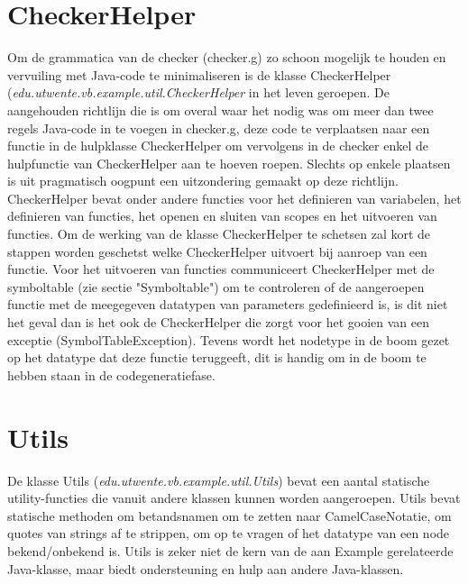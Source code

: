 \section{CheckerHelper}
Om de grammatica van de checker (checker.g) zo schoon mogelijk te houden en vervuiling met Java-code te minimaliseren is de klasse CheckerHelper (\emph{edu.utwente.vb.example.util.CheckerHelper} in het leven geroepen. De aangehouden richtlijn die is om overal waar het nodig was om meer dan twee regels Java-code in te voegen in checker.g, deze code te verplaatsen naar een functie in de hulpklasse CheckerHelper om vervolgens in de checker enkel de hulpfunctie van CheckerHelper aan te hoeven roepen. Slechts op enkele plaatsen is uit pragmatisch oogpunt een uitzondering gemaakt op deze richtlijn. CheckerHelper bevat onder andere functies voor het definieren van variabelen, het definieren van functies, het openen en sluiten van scopes en het uitvoeren van functies. Om de werking van de klasse CheckerHelper te schetsen zal kort de stappen worden geschetst welke CheckerHelper uitvoert bij aanroep van een functie.
Voor het uitvoeren van functies communiceert CheckerHelper met de symboltable (zie sectie "Symboltable") om te controleren of de aangeroepen functie met de meegegeven datatypen van parameters gedefinieerd is, is dit niet het geval dan is het ook de CheckerHelper die zorgt voor het gooien van een exceptie (SymbolTableException). Tevens wordt het nodetype in de boom gezet op het datatype dat deze functie teruggeeft, dit is handig om in de boom te hebben staan in de codegeneratiefase.

\section{Utils}
De klasse Utils (\emph{edu.utwente.vb.example.util.Utils}) bevat een aantal statische utility-functies die vanuit andere klassen kunnen worden aangeroepen. Utils bevat statische methoden om betandsnamen om te zetten naar CamelCaseNotatie, om quotes van strings af te strippen, om op te vragen of het datatype van een node bekend/onbekend is. Utils is zeker niet de kern van de aan Example gerelateerde Java-klasse, maar biedt ondersteuning en hulp aan andere Java-klassen.

